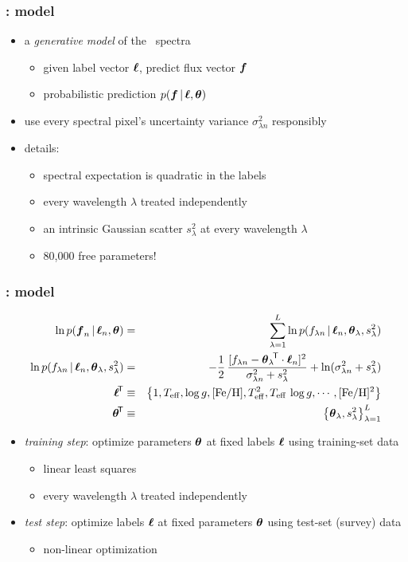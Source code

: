 \documentclass[pdftex]{beamer}
\newcommand{\teff}{T_{\mathrm{eff}}}
\newcommand{\logg}{\log g}
\newcommand{\feh}{[\mathrm{Fe / H}]}
\begin{document}
\begin{frame}
  \frametitle{\tc: model}
  \begin{itemize}
  \item a \emph{generative model} of the \apogee\ spectra
    \begin{itemize}
    \item given label vector $\boldsymbol{\ell}$, predict flux vector $\boldsymbol{f}$
    \item probabilistic prediction $p(\boldsymbol{f}\,|\,\boldsymbol{\ell},\boldsymbol{\theta})$
    \end{itemize}
  \item use every spectral pixel's uncertainty variance $\sigma^2_{\lambda n}$ responsibly
  \item details:
    \begin{itemize}
    \item spectral expectation is quadratic in the labels
    \item every wavelength $\lambda$ treated independently
    \item an intrinsic Gaussian scatter $s^2_\lambda$ at every wavelength $\lambda$
    \item 80,000 free parameters!
    \end{itemize}
  \end{itemize}
\end{frame}

\begin{frame}
  \frametitle{\tc: model}
  \begin{eqnarray}
    \ln p(\fluxes_n\given\labels_n,\pars) &=& \sum_{\lambda=1}^L \ln p(\flux_{\lambda n}\given\labels_n,\pars_\lambda,s^2_\lambda)
    \nonumber \\
    \ln p(\flux_{\lambda n}\given\labels_n,\pars_\lambda,s^2_\lambda) &=& -\frac{1}{2}\,\frac{[f_{\lambda n} - \transpose{\pars_\lambda}\cdot\labels_n]^2}{\sigma^2_{\lambda n} + s^2_\lambda} + \ln (\sigma^2_{\lambda n} + s^2_\lambda)
    \nonumber \\
    \transpose{\labels} &\equiv& \left\{1, \teff, \logg, \feh, \teff^2, \teff\,\logg, \cdots, \feh^2\right\}
    \nonumber \\
    \transpose{\pars} &\equiv& \left\{\pars_\lambda, s^2_\lambda\right\}_{\lambda=1}^L
    \nonumber
  \end{eqnarray}
  \begin{itemize}
  \item \emph{training step}: optimize parameters $\boldsymbol{\theta}$ at fixed labels
    $\boldsymbol{\ell}$ using training-set data
    \begin{itemize}
    \item linear least squares
    \item every wavelength $\lambda$ treated independently
    \end{itemize}
  \item \emph{test step}: optimize labels $\boldsymbol{\ell}$ at fixed
    parameters $\boldsymbol{\theta}$ using test-set (survey) data
    \begin{itemize}
    \item non-linear optimization
    \end{itemize}
  \end{itemize}
\end{frame}
\end{document}
